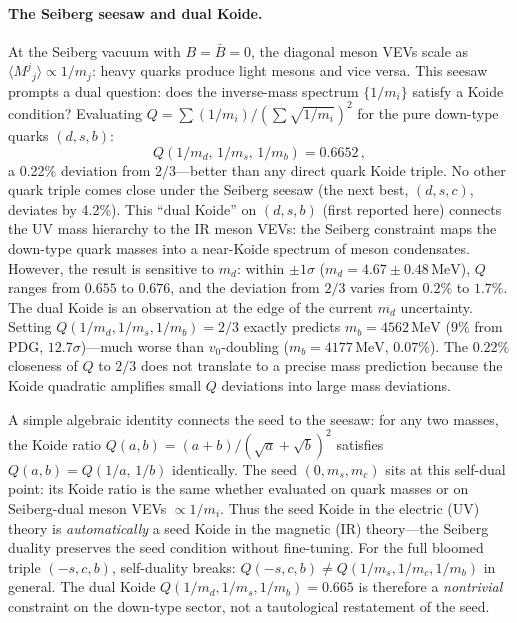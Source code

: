 \documentclass[12pt,a4paper]{article}
\newcommand{\MeV}{\,\text{MeV}}
\begin{document}
\paragraph{The Seiberg seesaw and dual Koide.}
At the Seiberg vacuum with $B = \bar B = 0$, the diagonal meson VEVs
scale as $\langle M^j{}_j\rangle \propto 1/m_j$: heavy quarks produce
light mesons and vice versa. This seesaw prompts a dual question: does
the inverse-mass spectrum $\{1/m_i\}$ satisfy a Koide condition?
Evaluating $Q = \sum(1/m_i)/(\sum\sqrt{1/m_i})^2$ for the pure
down-type quarks $(d,s,b)$:
\begin{equation*}
  Q(1/m_d,\, 1/m_s,\, 1/m_b) = 0.6652\,,
\end{equation*}
a 0.22\% deviation from $2/3$---better than any direct quark Koide
triple. No other quark triple comes close under
the Seiberg seesaw (the next best, $(d,s,c)$, deviates by 4.2\%).
This ``dual Koide'' on $(d,s,b)$ (first reported here) connects
the UV mass hierarchy to the IR meson VEVs: the Seiberg constraint
maps the down-type quark masses into a near-Koide spectrum of
meson condensates. However, the
result is sensitive to $m_d$: within $\pm 1\sigma$ ($m_d = 4.67
\pm 0.48\MeV$), $Q$ ranges from $0.655$ to $0.676$, and the deviation
from $2/3$ varies from $0.2\%$ to $1.7\%$. The dual Koide is an
observation at the edge of the current $m_d$ uncertainty.
Setting $Q(1/m_d,1/m_s,1/m_b) = 2/3$ exactly predicts
$m_b = 4562\MeV$ ($9\%$ from PDG, $12.7\sigma$)---much worse
than $v_0$-doubling ($m_b = 4177\MeV$, $0.07\%$).  The $0.22\%$
closeness of $Q$ to $2/3$ does not translate to a precise mass
prediction because the Koide quadratic amplifies small $Q$
deviations into large mass deviations.

A simple algebraic identity connects the seed to the seesaw:
for any two masses, the Koide ratio
$Q(a,b) = (a+b)/(\sqrt{a}+\sqrt{b})^2$ satisfies
$Q(a,b) = Q(1/a,\,1/b)$ identically.
The seed $(0, m_s, m_c)$ sits at this self-dual point:
its Koide ratio is the same whether evaluated on quark masses or
on Seiberg-dual meson VEVs $\propto 1/m_i$.  Thus the seed Koide
in the electric (UV) theory is \emph{automatically} a seed Koide
in the magnetic (IR) theory---the Seiberg duality preserves the
seed condition without fine-tuning.
For the full bloomed triple $(-s,c,b)$, self-duality breaks:
$Q(-s,c,b) \neq Q(1/m_s,1/m_c,1/m_b)$ in general.
The dual Koide $Q(1/m_d,1/m_s,1/m_b) = 0.665$ is therefore a
\emph{nontrivial} constraint on the down-type sector, not a
tautological restatement of the seed.
\end{document}
